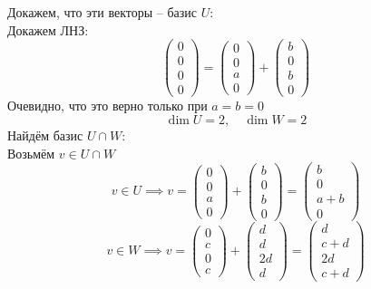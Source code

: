 Докажем, что эти векторы -- базис $ U $: \\
Докажем ЛНЗ:
$$
\begin{pmatrix}
	0 \\
    0 \\
    0 \\
    0
\end{pmatrix} =
\begin{pmatrix}
	0 \\
    0 \\
    a \\
    0
\end{pmatrix} +
\begin{pmatrix}
	b \\
    0 \\
    b \\
    0
\end{pmatrix} $$
Очевидно, что это верно только при $ a = b = 0 $
$$ \dim U = 2, \quad \dim W = 2 $$
Найдём базис $ U \cap W $: \\
Возьмём $ v \in U \cap W $
$$ v \in U \implies v =
\begin{pmatrix}
	0 \\
    0 \\
    a \\
    0
\end{pmatrix} +
\begin{pmatrix}
	b \\
    0 \\
    b \\
    0
\end{pmatrix} =
\begin{pmatrix}
	b \\
    0 \\
    a + b \\
    0
\end{pmatrix} $$
$$ v \in W \implies v =
\begin{pmatrix}
	0 \\
    c \\
    0 \\
    c
\end{pmatrix} +
\begin{pmatrix}
	d \\
    d \\
    2d \\
    d
\end{pmatrix} =
\begin{pmatrix}
	d \\
    c + d \\
    2d \\
    c + d
\end{pmatrix} $$

